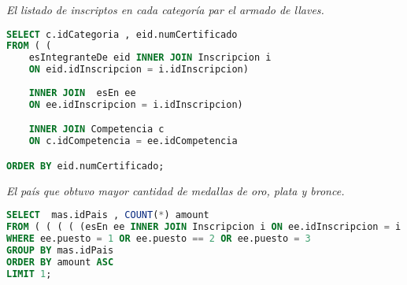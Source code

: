 

\emph{El listado de inscriptos en cada categoría par el armado de llaves.}
\begin{lstlisting}[language=SQL]
SELECT c.idCategoria , eid.numCertificado 
FROM ( (
	esIntegranteDe eid INNER JOIN Inscripcion i 
	ON eid.idInscripcion = i.idInscripcion) 
	
	INNER JOIN  esEn ee 
	ON ee.idInscripcion = i.idInscripcion) 

	INNER JOIN Competencia c 
	ON c.idCompetencia = ee.idCompetencia

ORDER BY eid.numCertificado;
\end{lstlisting}

\emph{El país que obtuvo mayor cantidad de medallas de oro, plata y bronce.}
\begin{lstlisting}[language=SQL]
SELECT	mas.idPais , COUNT(*) amount 
FROM ( ( ( ( (esEn ee INNER JOIN Inscripcion i ON ee.idInscripcion = i.idInscripcion) INNER JOIN  esIntegranteDe eid ON eid.idInscripcion = i.idInscripcion ) INNER JOIN Estudiante e ON e.numCertificado = eid.numCertificado) INNER JOIN Escuela esc ON e.idEscuela = esc.idEscuela) INNER JOIN Mestro mas ON esc.idMaestro = mas.placaInstructor) 
WHERE ee.puesto = 1 OR ee.puesto == 2 OR ee.puesto = 3 
GROUP BY mas.idPais 
ORDER BY amount ASC 
LIMIT 1;
\end{lstlisting}


